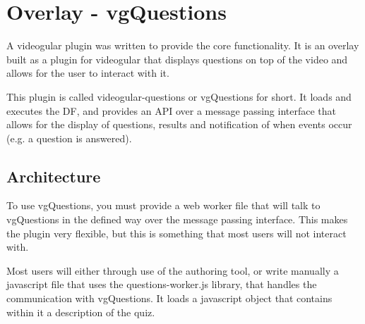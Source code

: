 \chapter{Overlay - vgQuestions} \label{Chapter:Overlay}

\begin{preamble}
A videogular plugin was written to provide the core functionality. It is an overlay built as a plugin for videogular that displays questions on top of the video and allows for the user to interact with it.

This plugin is called videogular-questions or \gls{vgQuestions} for short. It loads and executes the \gls{DF}, and provides an API over a message passing interface that allows for the display of questions, results and notification of when events occur (e.g. a question is answered).
\end{preamble}

\section{Architecture}
\label{Section:Architecture}

To use vgQuestions, you must provide a web worker file that will talk to
vgQuestions in the defined way over the message passing interface. This makes
the plugin very flexible, but this is something that most users will not
interact with.

Most users will either through use of the authoring tool, or write manually a
javascript file that uses the questions-worker.js library, that handles the
communication with vgQuestions. It loads a javascript object that contains
within it a description of the quiz.

